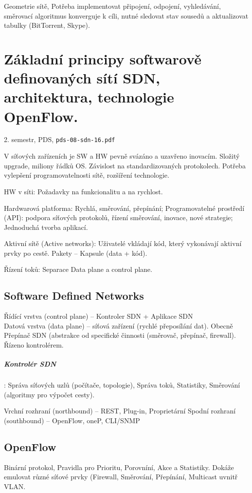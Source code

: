 \documentclass[a4paper, 11pt]{report}
\begin{document}
Geometrie sítě, Potřeba implementovat připojení, odpojení, vyhledávání, směrovací algoritmus konverguje k cíli, nutné sledovat stav sousedů a aktualizovat tabulky (BitTorrent, Skype).


\chapter{Základní principy softwarově definovaných sítí SDN, architektura, technologie OpenFlow.} \label{cha:42}
2. semestr, PDS, \texttt{pds-08-sdn-16.pdf}

V síťových zařízeních je SW a HW pevně svázáno a uzavřeno inovacím. Složitý upgrade, miliony řádků OS. Závislost na standardizovaných protokolech. Potřeba vylepšení programovatelnosti sítě, rozšíření technologie.

HW v síti: Požadavky na funkcionalitu a na rychlost.

Hardwarová platforma: Rychlá, směrování, přepínání; Programovatelné prostředí (API): podpora síťových protokolů, řízení směrování, inovace, nové strategie; Jednoduchá tvorba aplikací.

Aktivní sítě (Active networks): Uživatelé vkládají kód, který vykonávají aktivní prvky po cestě. Pakety -- Kapsule (data + kód).

Řízení toků: Separace Data plane a control plane.

\section{Software Defined Networks}
Řídící vrstva (control plane) -- Kontroler SDN + Aplikace SDN\\
Datová vrstva (data plane) -- síťová zařízení (rychlé přeposílání dat). Obecně Přepínač SDN (abstrakce od specifické činnosti (směrovač, přepínač, firewall). Řízeno kontrolérem.

\paragraph{Kontrolér SDN}: Správa síťových uzlů (počítače, topologie), Správa toků, Statistiky, Směrování (algoritmy pro výpočet cesty).

Vrchní rozhraní (northbound) -- REST, Plug-in, Proprietární
Spodní rozhraní (southbound) -- OpenFlow, oneP, CLI/SNMP

\section{OpenFlow}
Binární protokol, Pravidla pro Prioritu, Porovníní, Akce a Statistiky. Dokáže emulovat různé síťové prvky (Firewall, Směrování, Přepínání, Multicast uvnitř VLAN.
\end{document}
